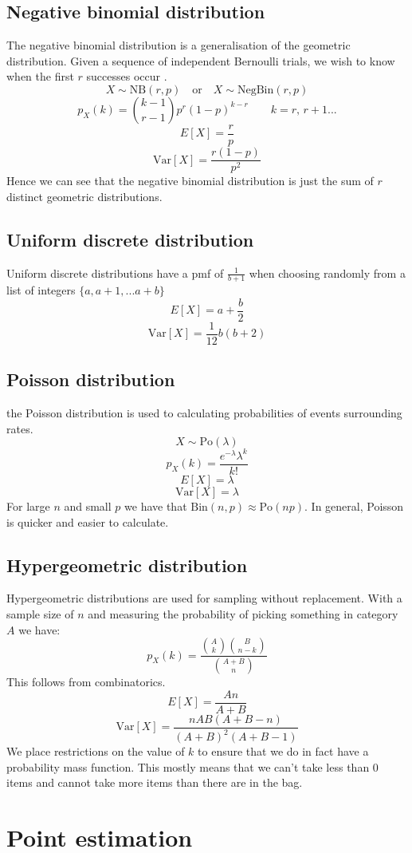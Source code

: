 \documentclass[12pt]{article}
\newcommand{\Var}[1]{\text{Var}[#1]}
\begin{document}
\subsection*{Negative binomial distribution}
The negative binomial distribution is a generalisation of the geometric distribution. Given a sequence of independent Bernoulli trials, we wish to know when the first \(r\) successes occur .
\[X\sim\text{NB}(r,p)\quad \text{or}\quad X\sim\text{NegBin}(r,p)\]
\[p_X(k)=\binom{k-1}{r-1}p^r(1-p)^{k-r}\qquad k=r,\,r+1...\]
\[E[X]=\frac{r}{p}\]
\[\Var{X}=\frac{r(1-p)}{p^2}\]
Hence we can see that the negative binomial distribution is just the sum of \(r\) distinct geometric distributions.
\subsection*{Uniform discrete distribution}
Uniform discrete distributions have a pmf of \(\frac{1}{b+1}\) when choosing randomly from a list of integers \(\{a,a+1,...a+b\}\)
\[E[X]=a+\frac{b}{2}\]
\[\Var{X}=\frac{1}{12}b(b+2)\]
\subsection*{Poisson distribution}
the Poisson distribution is used to calculating probabilities of events surrounding rates.
\[X\sim\text{Po}(\lambda)\]
\[p_X(k)=\frac{e^{-\lambda}\lambda^k}{k!}\]
\[E[X]=\lambda\]
\[\Var{X}=\lambda\]
For large \(n\) and small \(p\) we have that \(\text{Bin}(n,p)\approx\text{Po}(np)\). In general, Poisson is quicker and easier to calculate.
\subsection*{Hypergeometric distribution}
Hypergeometric distributions are used for sampling without replacement. With a sample size of \(n\) and measuring the probability of picking something in category \(A\) we have:
\[p_X(k)=\frac{\binom{A}{k}\binom{B}{n-k}}{\binom{A+B}{n}}\]
This follows from combinatorics.
\[E[X]=\frac{An}{A+B}\]
\[\Var{X}=\frac{nAB(A+B-n)}{(A+B)^2(A+B-1)}\]
We place restrictions on the value of \(k\) to ensure that we do in fact have a probability mass function. This mostly means that we can't take less than 0 items and cannot take more items than there are in the bag.
\section{Point estimation}
\end{document}
